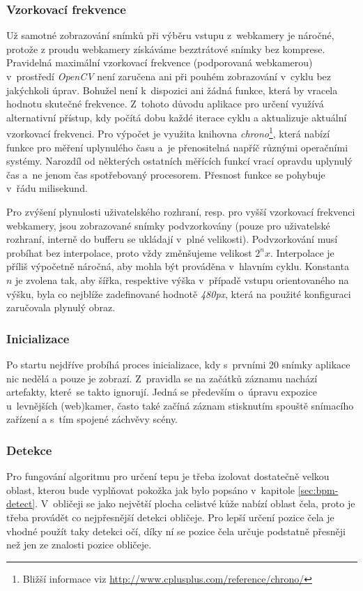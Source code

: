 \documentclass[
  digital, %
  table,   %
%
  lof,     %
  lot,     %
]{fithesis3}
\begin{document}
\subsubsection{Vzorkovací frekvence}
Už samotné zobrazování snímků při výběru vstupu z~webkamery je náročné, protože z proudu webkamery získáváme bezztrátové snímky bez komprese. Pravidelná maximální vzorkovací frekvence (podporovaná webkamerou) v~prostředí \emph{OpenCV} není zaručena ani při pouhém zobrazování v~cyklu bez jakýchkoli úprav. Bohužel není k~dispozici ani žádná funkce, která by vracela hodnotu skutečné frekvence. Z~tohoto důvodu aplikace pro určení využívá alternativní přístup, kdy počítá dobu každé iterace cyklu a aktualizuje aktuální vzorkovací frekvenci. Pro výpočet je využita knihovna \emph{chrono}\footnote{Bližší informace viz \url{http://www.cplusplus.com/reference/chrono/}}, která nabízí funkce pro měření uplynulého času a~je přenositelná napříč různými operačními systémy. Narozdíl od některých ostatních měřících funkcí vrací opravdu uplynulý čas a~ne jenom čas spotřebovaný procesorem. Přesnost funkce se pohybuje v~řádu milisekund.

Pro zvýšení plynulosti uživatelského rozhraní, resp. pro vyšší vzorkovací frekvenci webkamery, jsou zobrazované snímky podvzorkovány (pouze pro uživatelské rozhraní, interně do bufferu se ukládají v~plné velikosti). Podvzorkování musí probíhat bez interpolace, proto vždy změnšujeme velikost $2^nx$. Interpolace je příliš výpočetně náročná, aby mohla být prováděna v~hlavním cyklu. Konstanta $n$ je zvolena tak, aby šířka, respektive výška v~případě vstupu orientovaného na výšku, byla co nejblíže zadefinované hodnotě \emph{480px}, která na použité konfiguraci zaručovala plynulý obraz.

\subsubsection{Inicializace}
Po startu nejdříve probíhá proces inicializace, kdy s~prvními 20 snímky aplikace nic nedělá a pouze je zobrazí. Z~pravidla se na začátků záznamu nachází artefakty, které~se takto ignorují. Jedná se především o~úpravu expozice u~levnějších (web)kamer, často také začíná záznam stisknutím spouště snímacího zařízení a s~tím spojené záchvěvy scény.

\subsubsection{Detekce}
\label{sec:detection}
Pro fungování algoritmu pro určení tepu je třeba izolovat dostatečně velkou oblast, kterou bude vyplňovat pokožka jak bylo popsáno v~kapitole \ref{sec:bpm-detect}. V~obličeji se jako největší plocha celistvé kůže nabízí oblast čela, proto je třeba provádět co nejpřesnější detekci obličeje. Pro lepší určení pozice čela je vhodné použít taky detekci očí, díky ní se pozice čela určuje podstatně přesněji než jen ze znalosti pozice obličeje.
\end{document}
